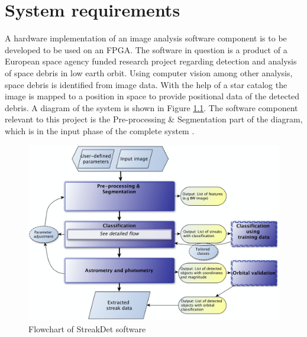 \documentclass[12pt]{report}
\begin{document}

\chapter{System requirements}

A hardware implementation of an image analysis software component is to be developed to be used on an FPGA. The software in question is a product of a European space agency funded research project regarding detection and analysis of space debris in low earth orbit. Using computer vision among other analysis, space debris is identified from image data. With the help of a star catalog the image is mapped to a position in space to provide positional data of the detected debris. A diagram of the system is shown in Figure \ref{fig:0}. The software component relevant to this project is the Pre-processing \& Segmentation part of the diagram, which is in the input phase of the complete system \citep{StreakDet} \citep{Starmatch}.

\begin{figure}[h]
    \centering
    \includegraphics[scale=0.2]{figures/streakdet.png}
    \caption{Flowchart of StreakDet software \citep{StreakDet}}
    \label{fig:0}
\end{figure}
\end{document}
